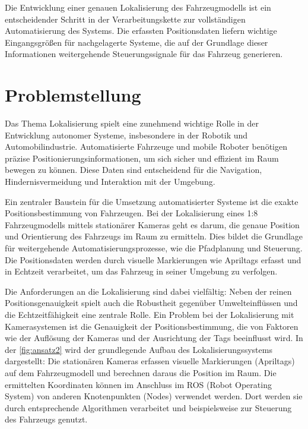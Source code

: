 \documentclass[ngerman]{article}    %
\theoremstyle{definition}
\begin{document}
Die Entwicklung einer genauen Lokalisierung des Fahrzeugmodells ist ein entscheidender Schritt in der Verarbeitungskette zur vollständigen Automatisierung des Systems. Die erfassten Positionsdaten liefern wichtige Eingangsgrößen für nachgelagerte Systeme, die auf der Grundlage dieser Informationen weitergehende Steuerungssignale für das Fahrzeug generieren.




\newpage

\section{Problemstellung}

Das Thema Lokalisierung spielt eine zunehmend wichtige Rolle in der Entwicklung autonomer Systeme, insbesondere in der Robotik und Automobilindustrie. Automatisierte Fahrzeuge und mobile Roboter benötigen präzise Positionierungsinformationen, um sich sicher und effizient im Raum bewegen zu können. Diese Daten sind entscheidend für die Navigation, Hindernisvermeidung und Interaktion mit der Umgebung.

Ein zentraler Baustein für die Umsetzung automatisierter Systeme ist die exakte Positionsbestimmung von Fahrzeugen. Bei der Lokalisierung eines 1:8 Fahrzeugmodells mittels stationärer Kameras geht es darum, die genaue Position und Orientierung des Fahrzeugs im Raum zu ermitteln. Dies bildet die Grundlage für weitergehende Automatisierungsprozesse, wie die Pfadplanung und Steuerung. Die Positionsdaten werden durch visuelle Markierungen wie Apriltags erfasst und in Echtzeit verarbeitet, um das Fahrzeug in seiner Umgebung zu verfolgen.

Die Anforderungen an die Lokalisierung sind dabei vielfältig: Neben der reinen Positionsgenauigkeit spielt auch die Robustheit gegenüber Umwelteinflüssen und die Echtzeitfähigkeit eine zentrale Rolle. Ein Problem bei der Lokalisierung mit Kamerasystemen ist die Genauigkeit der Positionsbestimmung, die von Faktoren wie der Auflösung der Kameras und der Ausrichtung der Tags beeinflusst wird. In der \autoref{fig:ansatz2} wird der grundlegende Aufbau des Lokalisierungssystems dargestellt: Die stationären Kameras erfassen visuelle Markierungen (Apriltags) auf dem Fahrzeugmodell und berechnen daraus die Position im Raum. Die ermittelten Koordinaten können im Anschluss im ROS (Robot Operating System) von anderen Knotenpunkten (Nodes) verwendet werden. Dort werden sie durch entsprechende Algorithmen verarbeitet und beispielsweise zur Steuerung des Fahrzeugs genutzt.
\end{document}

